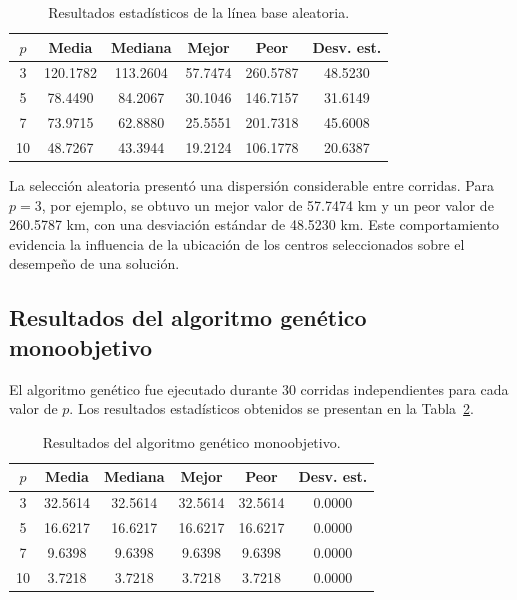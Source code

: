 \documentclass[journal]{IEEEtran}
\begin{document}
\begin{table}[!t]
	\centering
	\caption{Resultados estadísticos de la línea base aleatoria.}
	\label{tab:resultados_aleatorios}
	\begin{tabular}{cccccc}
		\toprule
		\textbf{$p$} &
		\textbf{Media} &
		\textbf{Mediana} &
		\textbf{Mejor} &
		\textbf{Peor} &
		\textbf{Desv. est.} \\
		\midrule
		3  & 120.1782 & 113.2604 & 57.7474 & 260.5787 & 48.5230 \\
		5  &  78.4490 &  84.2067 & 30.1046 & 146.7157 & 31.6149 \\
		7  &  73.9715 &  62.8880 & 25.5551 & 201.7318 & 45.6008 \\
		10 &  48.7267 &  43.3944 & 19.2124 & 106.1778 & 20.6387 \\
		\bottomrule
	\end{tabular}
\end{table}

La selección aleatoria presentó una dispersión considerable entre corridas. Para $p=3$, por ejemplo, se obtuvo un mejor valor de 57.7474 km y un peor valor de 260.5787 km, con una desviación estándar de 48.5230 km. Este comportamiento evidencia la influencia de la ubicación de los centros seleccionados sobre el desempeño de una solución.

\subsection{Resultados del algoritmo genético monoobjetivo}

El algoritmo genético fue ejecutado durante 30 corridas independientes para cada valor de $p$. Los resultados estadísticos obtenidos se presentan en la Tabla~\ref{tab:resultados_ga}.

\begin{table}[!t]
	\centering
	\caption{Resultados del algoritmo genético monoobjetivo.}
	\label{tab:resultados_ga}
	\begin{tabular}{cccccc}
		\toprule
		\textbf{$p$} &
		\textbf{Media} &
		\textbf{Mediana} &
		\textbf{Mejor} &
		\textbf{Peor} &
		\textbf{Desv. est.} \\
		\midrule
		3  & 32.5614 & 32.5614 & 32.5614 & 32.5614 & 0.0000 \\
		5  & 16.6217 & 16.6217 & 16.6217 & 16.6217 & 0.0000 \\
		7  &  9.6398 &  9.6398 &  9.6398 &  9.6398 & 0.0000 \\
		10 &  3.7218 &  3.7218 &  3.7218 &  3.7218 & 0.0000 \\
		\bottomrule
	\end{tabular}
\end{table}
\end{document}
